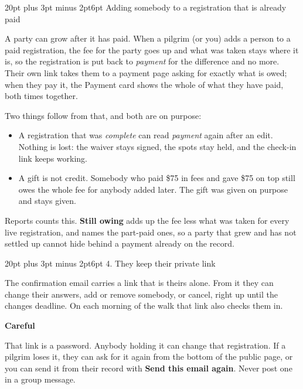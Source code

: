 \documentclass[12pt]{article}
\makeatletter
\renewcommand\subsection{\@startsection{subsection}{2}{0pt}%
  {20pt plus 3pt minus 2pt}{6pt}%
  {\normalfont\large\bfseries\color{ink}}}
\newcommand{\notecolour}{softbg}
\newenvironment{note}[2][softbg]
  {\renewcommand{\notecolour}{#1}%
   \par\medskip
   \setlength{\fboxsep}{11pt}%
   \begin{lrbox}{\notebox}%
   \begin{minipage}{\dimexpr\linewidth-2\fboxsep\relax}%
   \setlength{\parskip}{7pt}%
   \textbf{#2}\par}
  {\end{minipage}%
   \end{lrbox}%
   \noindent\expandafter\colorbox\expandafter{\notecolour}{\usebox{\notebox}}%
   \par\medskip}
\newcommand{\btn}[1]{\textbf{#1}}
\makeatother
\begin{document}
\subsection{Adding somebody to a registration that is already paid}

A party can grow after it has paid. When a pilgrim (or you) adds a
person to a paid registration, the fee for the party goes up and what
was taken stays where it is, so the registration is put back to
\textit{payment} for the difference and no more. Their own link takes them
to a payment page asking for exactly what is owed; when they pay it, the
Payment card shows the whole of what they have paid, both times
together.

Two things follow from that, and both are on purpose:

\begin{itemize}
\item A registration that was \textit{complete} can read \textit{payment} again
  after an edit. Nothing is lost: the waiver stays signed, the spots stay
  held, and the check-in link keeps working.
\item A gift is not credit. Somebody who paid \$75 in fees and gave
  \$75 on top still owes the whole fee for anybody added later. The gift
  was given on purpose and stays given.
\end{itemize}

Reports counts this. \textbf{Still owing} adds up the fee less what was
taken for every live registration, and names the part-paid ones, so a
party that grew and has not settled up cannot hide behind a payment
already on the record.

\subsection{4. They keep their private link}

The confirmation email carries a link that is theirs alone. From it they
can change their answers, add or remove somebody, or cancel, right up
until the changes deadline. On each morning of the walk that link also
checks them in.

\begin{note}{Careful}
That link is a password. Anybody holding it can change that
registration. If a pilgrim loses it, they can ask for it again from the
bottom of the public page, or you can send it from their record with
\btn{Send this email again}. Never post one in a group message.
\end{note}
\end{document}
